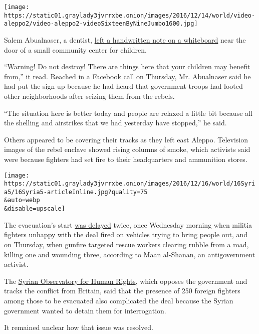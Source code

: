 \texttt{[image: https://static01.graylady3jvrrxbe.onion/images/2016/12/14/world/video-aleppo2/video-aleppo2-videoSixteenByNineJumbo1600.jpg]}

Salem Abualnaser, a dentist,
\href{https://www.facebookcorewwwi.onion/photo.php?fbid=1722860838030708\&set=a.1439006866416108.1073741829.100009204267784\&type=3\&theater}{left
a handwritten note on a whiteboard} near the door of a small community
center for children.

``Warning! Do not destroy! There are things here that your children may
benefit from,'' it read. Reached in a Facebook call on Thursday, Mr.
Abualnaser said he had put the sign up because he had heard that
government troops had looted other neighborhoods after seizing them from
the rebels.

``The situation here is better today and people are relaxed a little bit
because all the shelling and airstrikes that we had yesterday have
stopped,'' he said.

Others appeared to be covering their tracks as they left east Aleppo.
Television images of the rebel enclave showed rising columns of smoke,
which activists said were because fighters had set fire to their
headquarters and ammunition stores.

\texttt{[image: https://static01.graylady3jvrrxbe.onion/images/2016/12/16/world/16Syria5/16Syria5-articleInline.jpg?quality=75\\\&auto=webp\\\&disable=upscale]}

The evacuation's start
\href{https://www.nytimes3xbfgragh.onion/2016/12/14/world/middleeast/aleppo-syria-evacuation-deal.html?rref=collection\%2Fbyline\%2Fanne-barnard\&action=click\&contentCollection=undefined\&region=stream\&module=stream_unit\&version=latest\&contentPlacement=2\&pgtype=collection}{was
delayed} twice, once Wednesday morning when militia fighters unhappy
with the deal fired on vehicles trying to bring people out, and on
Thursday, when gunfire targeted rescue workers clearing rubble from a
road, killing one and wounding three, according to Maan al-Shanan, an
antigovernment activist.

The \href{http://www.syriahr.com/en/}{Syrian Observatory for Human
Rights}, which opposes the government and tracks the conflict from
Britain, said that the presence of 250 foreign fighters among those to
be evacuated also complicated the deal because the Syrian government
wanted to detain them for interrogation.

It remained unclear how that issue was resolved.

